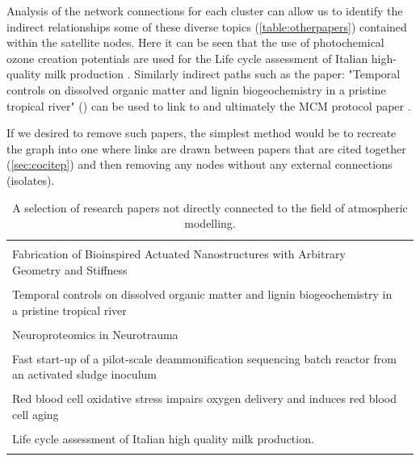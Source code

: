 Analysis of the network connections for each cluster can allow us to identify the indirect relationships some of these diverse topics (\autoref{table:otherpapers}) contained within the satellite nodes. Here it can be seen that the use of photochemical ozone creation potentials \citep{milk1,milk2} are used for the Life cycle assessment of Italian high-quality milk production \citep{milk}. 
Similarly indirect paths such as the paper:
 "Temporal controls on dissolved organic matter and lignin biogeochemistry in a pristine tropical river" (\citep{biogeo}) can be used to link to \citep{georiver1} and ultimately the MCM protocol paper \citep{mcmpartA}.
 
 If we desired to remove such papers, the simplest method would be to recreate the graph into one where links are drawn between papers that are cited together (\autoref{sec:cocitep})
 and then removing any nodes without any external connections (isolates).

\begin{table}[H]
\begin{center}
\begin{tabular}{ p{}|l }
 \hline
   & \\
 Fabrication of Bioinspired Actuated Nanostructures with Arbitrary Geometry and Stiffness & \citep{nano} \\ \\
 Temporal controls on dissolved organic matter and lignin biogeochemistry in a pristine tropical river  & \citep{biogeo} \\ \\
Neuroproteomics in Neurotrauma & \citep{neurotrauma}\\ \\
%
Fast start-up of a pilot-scale deammonification sequencing batch reactor from an activated sludge inoculum & \citep{pilot} \\ \\
Red blood cell oxidative stress impairs oxygen  delivery and induces red blood cell aging & \citep{blood} \\ \\
%
Life cycle assessment of Italian high quality milk production. & \citep{milk}\\ \\
%
 \hline
\end{tabular}
\end{center}

\caption{A selection of research papers not directly connected to the field of atmospheric modelling.}
\label{table:otherpapers}
\end{table}




